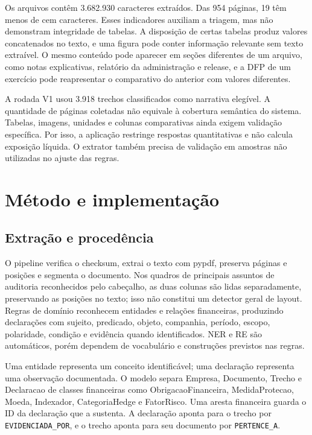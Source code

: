 \documentclass[conference]{IEEEtran}
\begin{document}
Os arquivos contêm 3.682.930 caracteres extraídos. Das 954 páginas, 19 têm menos de cem caracteres. Esses indicadores auxiliam a triagem, mas não demonstram integridade de tabelas. A disposição de certas tabelas produz valores concatenados no texto, e uma figura pode conter informação relevante sem texto extraível. O mesmo conteúdo pode aparecer em seções diferentes de um arquivo, como notas explicativas, relatório da administração e release, e a DFP de um exercício pode reapresentar o comparativo do anterior com valores diferentes.

A rodada V1 usou 3.918 trechos classificados como narrativa elegível. A quantidade de páginas coletadas não equivale à cobertura semântica do sistema. Tabelas, imagens, unidades e colunas comparativas ainda exigem validação específica. Por isso, a aplicação restringe respostas quantitativas e não calcula exposição líquida. O extrator também precisa de validação em amostras não utilizadas no ajuste das regras.

\section{Método e implementação}

\subsection{Extração e procedência}\label{sec:extracao}

O pipeline verifica o checksum, extrai o texto com pypdf, preserva páginas e posições e segmenta o documento. Nos quadros de principais assuntos de auditoria reconhecidos pelo cabeçalho, as duas colunas são lidas separadamente, preservando as posições no texto; isso não constitui um detector geral de layout. Regras de domínio reconhecem entidades e relações financeiras, produzindo declarações com sujeito, predicado, objeto, companhia, período, escopo, polaridade, condição e evidência quando identificados. NER e RE são automáticos, porém dependem de vocabulário e construções previstos nas regras.

Uma entidade representa um conceito identificável; uma declaração representa uma observação documentada. O modelo separa Empresa, Documento, Trecho e Declaracao de classes financeiras como ObrigacaoFinanceira, MedidaProtecao, Moeda, Indexador, CategoriaHedge e FatorRisco. Uma aresta financeira guarda o ID da declaração que a sustenta. A declaração aponta para o trecho por \texttt{EVIDENCIADA\_POR}, e o trecho aponta para seu documento por \texttt{PERTENCE\_A}.
\end{document}
